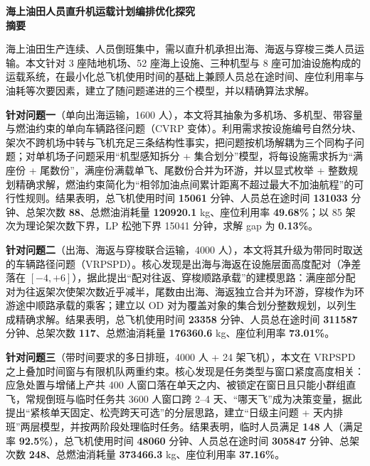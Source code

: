 \documentclass[UTF8,zihao=-4]{ctexart}
\numberwithin{figure}{section}
\numberwithin{table}{section}
\begin{document}
\begin{center}
  {\bfseries 海上油田人员直升机运载计划编排优化探究}\\[1.2em]
  {\bfseries 摘\quad 要}
\end{center}
\vspace{0.6em}

海上油田生产连续、人员倒班集中，需以直升机承担出海、海返与穿梭三类人员运输。本文针对 3 座陆地机场、52 座海上设施、三种机型与 8 座可加油设施构成的运载系统，在最小化总飞机使用时间的基础上兼顾人员总在途时间、座位利用率与油耗等次要因素，建立了随问题递进的三个模型，并以精确算法求解。

\textbf{针对问题一}（单向出海运输，1600 人），本文将其抽象为多机场、多机型、带容量与燃油约束的单向车辆路径问题（CVRP 变体）。利用需求按设施编号自然分块、架次不跨机场中转与飞机充足三条结构性事实，把问题按机场解耦为三个同构子问题；对单机场子问题采用“机型感知拆分 + 集合划分”模型，将每设施需求拆为“满座份 + 尾数份”，满座份满载单飞、尾数份合并为环游，并以显式枚举 + 整数规划精确求解，燃油约束简化为“相邻加油点间累计距离不超过最大不加油航程”的可行性规则。结果表明，总飞机使用时间 \textbf{15061} 分钟、人员总在途时间 \textbf{131033} 分钟、总架次数 \textbf{88}、总燃油消耗量 \textbf{120920.1} kg、座位利用率 \textbf{49.68\%}；以 85 架次为理论架次数下界，LP 松弛下界 15041 分钟，求解 gap 为 \textbf{0.13\%}。

\textbf{针对问题二}（出海、海返与穿梭联合运输，4000 人），本文将其升级为带同时取送的车辆路径问题（VRPSPD）。核心发现是出海与海返在设施层面高度配对（净差落在 $[-4,+6]$），据此提出“配对往返、穿梭顺路承载”的建模思路：满座部分配对为往返架次使架次数近乎减半，尾数由出海、海返独立合并为环游，穿梭作为环游途中顺路承载的乘客；建立以 OD 对为覆盖对象的集合划分整数规划，以列生成精确求解。结果表明，总飞机使用时间 \textbf{23358} 分钟、人员总在途时间 \textbf{311587} 分钟、总架次数 \textbf{117}、总燃油消耗量 \textbf{176360.6} kg、座位利用率 \textbf{73.01\%}。

\textbf{针对问题三}（带时间要求的多日排班，4000 人 + 24 架飞机），本文在 VRPSPD 之上叠加时间窗与有限机队两重约束。核心发现是任务类型与窗口紧度高度相关：应急处置与增储上产共 400 人窗口落在单天之内、被锁定在窗日且只能小群组直飞，常规倒班与临时任务共 3600 人窗口跨 2--4 天、“哪天飞”成为决策变量，据此提出“紧核单天固定、松壳跨天可选”的分层思路，建立“日级主问题 + 天内排班”两层模型，并按两阶段处理临时任务。结果表明，临时人员满足 \textbf{148} 人（满足率 \textbf{92.5\%}），总飞机使用时间 \textbf{48060} 分钟、人员总在途时间 \textbf{305847} 分钟、总架次数 \textbf{248}、总燃油消耗量 \textbf{373466.3} kg、座位利用率 \textbf{37.16\%}。
\end{document}
